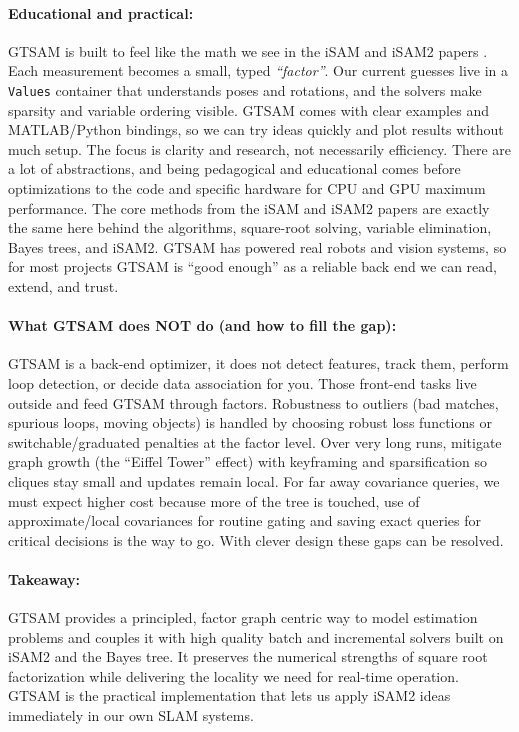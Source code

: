 \paragraph{Educational and practical:}
\gls{GTSAM} is built to feel like the math we see in the \gls{iSAM} and \gls{iSAM}2 papers \cite{iSAM_paper,iSAM2_paper}. Each measurement becomes a small, typed \textit{``factor''}. Our current guesses live in a \texttt{Values} container that understands poses and rotations, and the solvers make sparsity and variable ordering visible. \gls{GTSAM} comes with clear examples and MATLAB/Python bindings, so we can try ideas quickly and plot results without much setup. The focus is clarity and research, not necessarily efficiency. There are a lot of abstractions, and being pedagogical and educational comes before optimizations to the code and specific hardware for CPU and GPU maximum performance. The core methods from the \gls{iSAM} and \gls{iSAM}2 papers \cite{iSAM_paper,iSAM2_paper} are exactly the same here behind the algorithms, square-root solving, variable elimination, Bayes trees, and \gls{iSAM}2. \gls{GTSAM} has powered real robots and vision systems, so for most projects \gls{GTSAM} is ``good enough'' as a reliable back end we can read, extend, and trust. \cite{GTSAM_handbook}

\paragraph{What GTSAM does NOT do (and how to fill the gap):}
\gls{GTSAM} is a back-end optimizer, it does not detect features, track them, perform loop detection, or decide data association for you. Those front-end tasks live outside and feed \gls{GTSAM} through factors. Robustness to outliers (bad matches, spurious loops, moving objects) is handled by choosing robust loss functions or switchable/graduated penalties at the factor level. Over very long runs, mitigate graph growth (the ``Eiffel Tower'' effect) with keyframing and sparsification so cliques stay small and updates remain local. For far away covariance queries, we must expect higher cost because more of the tree is touched, use of approximate/local covariances for routine gating and saving exact queries for critical decisions is the way to go. With clever design these gaps can be resolved. \cite{GTSAM_handbook}

\paragraph{Takeaway:}
\gls{GTSAM} provides a principled, factor graph centric way to model estimation problems and couples it with high quality batch and incremental solvers built on \gls{iSAM}2 and the Bayes tree. It preserves the numerical strengths of square root factorization while delivering the locality we need for real-time operation. \gls{GTSAM} is the practical implementation that lets us apply \gls{iSAM}2 ideas immediately in our own \gls{SLAM} systems. \cite{GTSAM_handbook}

